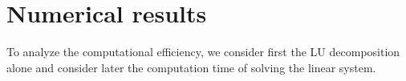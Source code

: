 \documentclass{article}
\begin{document}













\section{Numerical results} \FloatBarrier
To analyze the computational efficiency, we consider first the LU decomposition alone and consider later the computation time of solving the linear system.



\end{document}

